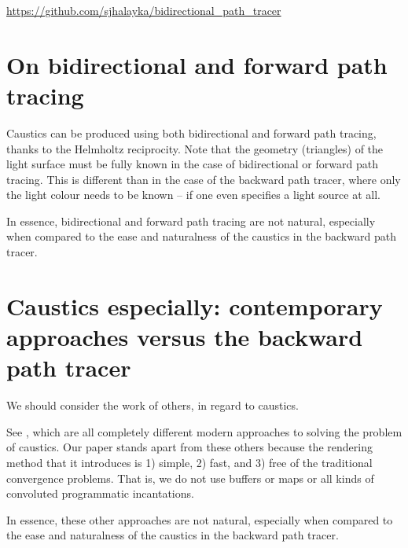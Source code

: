 \documentclass[12pt]{article}
\begin{document}
\url{https://github.com/sjhalayka/bidirectional_path_tracer}







\begin{appendix}





\section{On bidirectional and forward path tracing}

Caustics can be produced using both bidirectional and forward path tracing, thanks to the Helmholtz reciprocity.
Note that the geometry (triangles) of the light surface must be fully known in the case of bidirectional or forward path tracing.
This is different than in the case of the backward path tracer, where only the light colour needs to be known -- if one even specifies a light source at all.

In essence, bidirectional and forward path tracing are not natural, especially when compared to the ease and naturalness of the caustics in the backward path tracer.









\section{Caustics especially: contemporary approaches versus the backward path tracer}

We should consider the work of others, in regard to caustics.

See \cite{moreau, komarov, gruen, yang}, which are all completely different modern approaches to solving the problem of caustics.
Our paper stands apart from these others because the rendering method that it introduces is 1) simple, 2) fast, and 3) free of the traditional convergence problems.
That is, we do not use buffers or maps or all kinds of convoluted programmatic incantations.

In essence, these other approaches are not natural, especially when compared to the ease and naturalness of the caustics in the backward path tracer.






\end{appendix}
\end{document}
